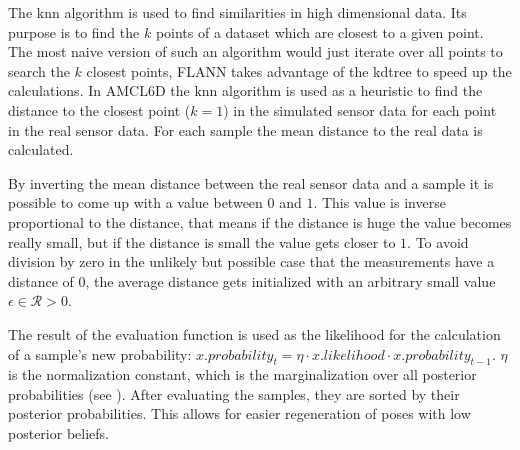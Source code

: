 \documentclass[Thesis.tex]{subfiles}
\begin{document}
The \gls{knn} algorithm is used to find similarities in high dimensional data\cite{flann_pami_2014}. Its purpose is to find the $k$ points of a dataset which are closest to a given point. The most naive version of such an algorithm would just iterate over all points to search the $k$ closest points, \gls{FLANN} takes advantage of the \gls{kdtree} to speed up the calculations. 
In \gls{AMCL6D} the \gls{knn} algorithm is used as a heuristic to find the distance to the closest point ($k=1$) in the simulated sensor data for each point in the real sensor data. For each sample the mean distance to the real data is calculated.

By inverting the mean distance between the real sensor data and a sample it is possible to come up with a value between $0$ and $1$. This value is inverse proportional to the distance, that means if the distance is huge the value becomes really small, but if the distance is small the value gets closer to $1$. To avoid division by zero in the unlikely but possible case that the measurements have a distance of $0$, the average distance gets initialized with an arbitrary small value $\epsilon \in \mathcal{R} > 0$.

The result of the evaluation function is used as the likelihood for the calculation of a sample's new probability: $x.probability_t = \eta \cdot x.likelihood \cdot x.probability_{t-1}$. $\eta$ is the normalization constant, which is the marginalization over all posterior probabilities (see ).
After evaluating the samples, they are sorted by their posterior probabilities. This allows for easier regeneration of poses with low posterior beliefs.
\end{document}
